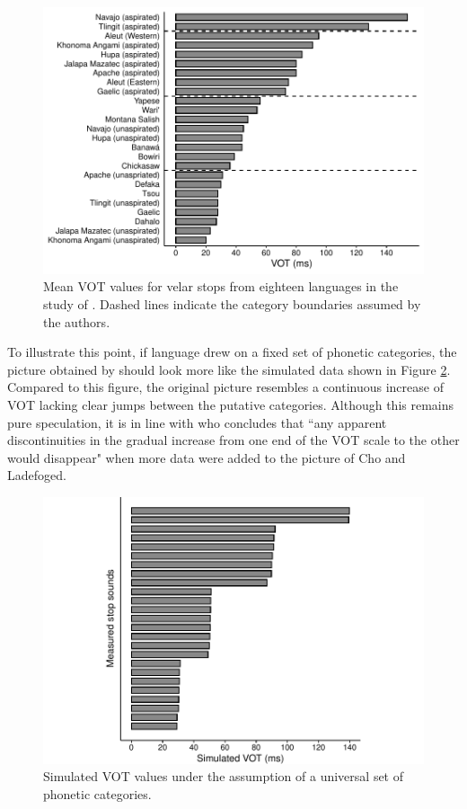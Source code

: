 \begin{figure}[h]
\begin{center}
\includegraphics[width=\linewidth]{figures/ch2/real_vot.pdf}
\caption[Mean VOT values for velar stops from eighteen languages in the study of \cite{ChoLadefoged1999}]{Mean VOT values for velar stops from eighteen languages in the study of \cite{ChoLadefoged1999}. Dashed lines indicate the category boundaries assumed by the authors.}
\label{fig:cho_ladefoged_1999}
\end{center}
\end{figure}

To illustrate this point, if language drew on a fixed set of phonetic categories, the picture obtained by \cite{ChoLadefoged1999} should look more like the simulated data shown in Figure \ref{fig:simulated_vot}. Compared to this figure, the original picture resembles a continuous increase of VOT lacking clear jumps between the putative categories. Although this remains pure speculation, it is in line with \citet[42]{Ladd2014} who concludes that ``any apparent discontinuities in the gradual increase from one end of the VOT scale to the other would disappear" when more data were added to the picture of Cho and Ladefoged.

\begin{figure}[h]
\includegraphics[width=\linewidth]{figures/ch2/simulated_vot.pdf}
\caption{Simulated VOT values under the assumption of a universal set of phonetic categories.}
\label{fig:simulated_vot}
\end{figure}

